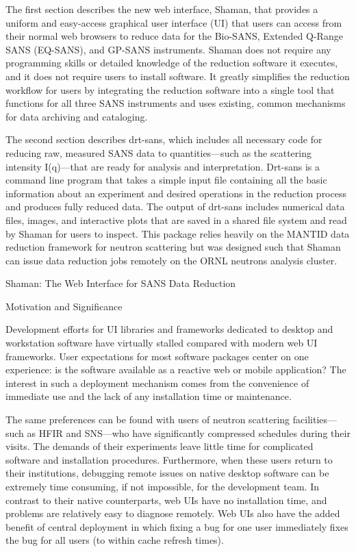 The first section describes the new web interface, Shaman, that provides a uniform and easy-access
graphical user interface (UI) that users can access from their normal web browsers to reduce data
for the Bio-SANS, Extended Q-Range SANS (EQ-SANS), and GP-SANS instruments. Shaman does not require
any programming skills or detailed knowledge of the reduction software it executes, and it does not
require users to install software. It greatly simplifies the reduction workflow for users by
integrating the reduction software into a single tool that functions for all three SANS instruments
and uses existing, common mechanisms for data archiving and cataloging.

The second section describes drt-sans, which includes all necessary code for reducing raw, measured
SANS data to quantities—such as the scattering intensity I(q)—that are ready for analysis and
interpretation. Drt-sans is a command line program that takes a simple input file containing all the
basic information about an experiment and desired operations in the reduction process and produces
fully reduced data. The output of drt-sans includes numerical data files, images, and interactive
plots that are saved in a shared file system and read by Shaman for users to inspect. This package
relies heavily on the MANTID data reduction framework for neutron scattering but was designed such
that Shaman can issue data reduction jobs remotely on the ORNL neutrons analysis cluster.

Shaman: The Web Interface for SANS Data Reduction

Motivation and Significance

Development efforts for UI libraries and frameworks dedicated to desktop and workstation software
have virtually stalled compared with modern web UI frameworks. User expectations for most software
packages center on one experience: is the software available as a reactive web or mobile
application? The interest in such a deployment mechanism comes from the convenience of immediate use
and the lack of any installation time or maintenance. 

The same preferences can be found with users of neutron scattering facilities—such as HFIR and
SNS—who have significantly compressed schedules during their visits. The demands of their
experiments leave little time for complicated software and installation procedures. Furthermore,
when these users return to their institutions, debugging remote issues on native desktop software
can be extremely time consuming, if not impossible, for the development team. In contrast to their
native counterparts, web UIs have no installation time, and problems are relatively easy to diagnose
remotely. Web UIs also have the added benefit of central deployment in which fixing a bug for one
user immediately fixes the bug for all users (to within cache refresh times).

